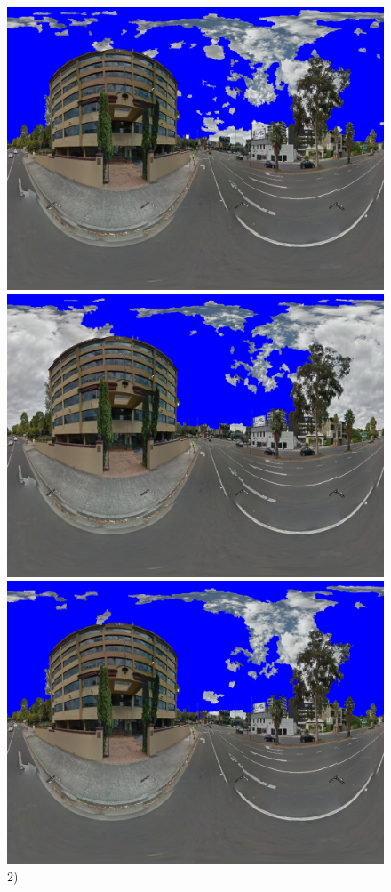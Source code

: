 \documentclass{article}
\begin{document}
\begin{figure}
\textbf{}\includegraphics[scale=0.08]{Images/mean/4880_7_6_100_ms_sky_mark.png} 
\textbf{}\includegraphics[scale=0.08]{Images/mean/4880_5_7_210_ms_sky_mark.png} 
\textbf{}\includegraphics[scale=0.08]{Images/mean/4880_7_8_300_ms_sky_mark.png} \scriptsize{2)}

\end{figure}
\end{document}
